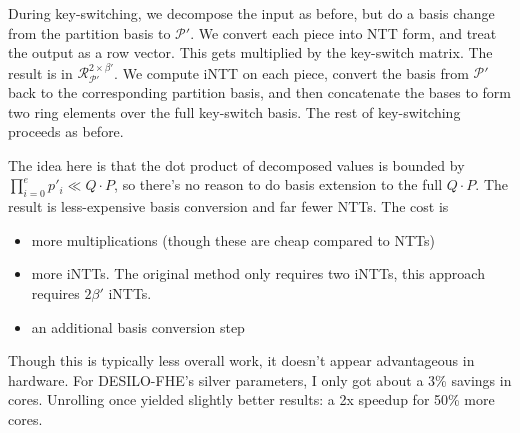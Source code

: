 \documentclass[../../fheimpl.tex]{subfiles}
\begin{document}
	During key-switching, we decompose the input as before, but do a basis change from the partition basis to $\mathcal{P}'$. We convert each piece into NTT form, and treat the output as a row vector. This gets multiplied by the key-switch matrix. The result is in $\mathcal{R}_{\mathcal{P}'}^{2\times \beta'}$. We compute iNTT on each piece, convert the basis from $\mathcal{P}'$ back to the corresponding partition basis, and then concatenate the bases to form two ring elements over the full key-switch basis. The rest of key-switching proceeds as before.
	
	The idea here is that the dot product of decomposed values is bounded by $\prod_{i=0}^e p'_i \ll Q\cdot P$, so there's no reason to do basis extension to the full $Q\cdot P$. The result is less-expensive basis conversion and far fewer NTTs. The cost is 
	\begin{itemize}
		\item more multiplications (though these are cheap compared to NTTs)
		\item more iNTTs. The original method only requires two iNTTs, this approach requires $2\beta'$ iNTTs.
		\item an additional basis conversion step
	\end{itemize}
	
	Though this is typically less overall work, it doesn't appear advantageous in hardware. For DESILO-FHE's silver parameters, I only got about a 3\% savings in cores. Unrolling once yielded slightly better results: a 2x speedup for 50\% more cores. 
	
	
	
	
\end{document}
